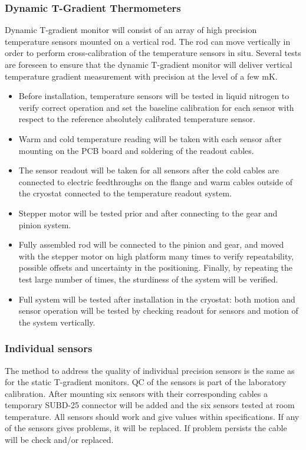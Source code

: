 \subsubsection{Dynamic T-Gradient Thermometers}
\label{sec:fdgen-slow-cryo-qc-thdy}

Dynamic T-gradient monitor will consist of an array of high precision temperature sensors mounted on a vertical rod. The rod can move vertically in order to perform cross-calibration of the temperature sensors in situ. Several tests are foreseen to ensure that the dynamic T-gradient monitor will deliver vertical temperature gradient measurement with precision at the level of a few mK.

\begin{itemize}
\item
Before installation, temperature sensors will be tested in liquid nitrogen to verify correct operation and set the baseline calibration for each sensor with respect to the reference absolutely calibrated temperature sensor.
\item
Warm and cold temperature reading will be taken with each sensor after mounting on the PCB board and soldering of the readout cables.
\item
The sensor readout will be taken for all sensors after the cold cables are connected to electric feedthroughs on the flange and warm cables outside of the cryostat connected to the temperature readout system.
\item 
Stepper motor will be tested prior and after connecting to the gear and pinion system.
\item
Fully assembled rod will be connected to the pinion and gear, and moved with the stepper motor on high platform many times to verify repeatability, possible offsets and uncertainty in the positioning. Finally, by repeating the test large number of times, the sturdiness of the system will be verified.
\item
Full system will be tested after installation in the cryostat: both motion and sensor operation will be tested by checking readout for sensors and motion of the system vertically.
\end{itemize} 

\subsubsection{Individual sensors}
\label{sec:fdgen-slow-cryo-qc-is}

The method to address the quality of individual precision sensors is the same as for the static T-gradient monitors.
QC of the sensors is part of the laboratory calibration. After mounting six sensors with their corresponding cables a
temporary SUBD-25 connector will be added and the six sensors tested at room temperature. All sensors should work and give values within specifications.  
If any of the sensors gives problems, it will be replaced. If problem persists the cable will be check and/or replaced.

